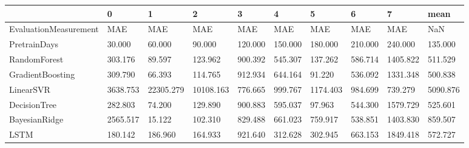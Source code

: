 \begin{tabular}{llllllllll}
\toprule
{} &        0 &         1 &         2 &       3 &       4 &        5 &       6 &        7 &     mean \\
\midrule
EvaluationMeasurement &      MAE &       MAE &       MAE &     MAE &     MAE &      MAE &     MAE &      MAE &      NaN \\
PretrainDays          &   30.000 &    60.000 &    90.000 & 120.000 & 150.000 &  180.000 & 210.000 &  240.000 &  135.000 \\
RandomForest          &  303.176 &    89.597 &   123.962 & 900.392 & 545.307 &  137.262 & 586.714 & 1405.822 &  511.529 \\
GradientBoosting      &  309.790 &    66.393 &   114.765 & 912.934 & 644.164 &   91.220 & 536.092 & 1331.348 &  500.838 \\
LinearSVR             & 3638.753 & 22305.279 & 10108.163 & 776.665 & 999.767 & 1174.403 & 984.699 &  739.279 & 5090.876 \\
DecisionTree          &  282.803 &    74.200 &   129.890 & 900.883 & 595.037 &   97.963 & 544.300 & 1579.729 &  525.601 \\
BayesianRidge         & 2565.517 &    15.122 &   102.310 & 829.488 & 661.023 &  759.917 & 538.851 & 1403.830 &  859.507 \\
LSTM                  &  180.142 &   186.960 &   164.933 & 921.640 & 312.628 &  302.945 & 663.153 & 1849.418 &  572.727 \\
\bottomrule
\end{tabular}
